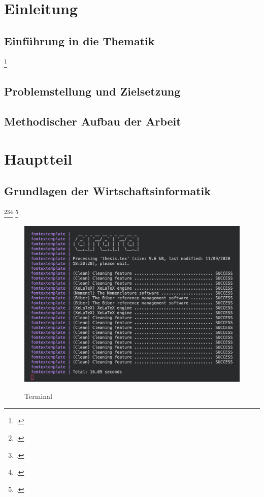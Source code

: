 \section{Einleitung}
\subsection{Einführung in die Thematik}
\blindtext{}
\blindtext\footcite[][]{mswpf}

\subsection{Problemstellung und Zielsetzung}
\blindtext

\subsection{Methodischer Aufbau der Arbeit}
\blindtext

\section{Hauptteil}
\subsection{Grundlagen der Wirtschaftsinformatik}
\blindtext\footcite[][]{msdatabind}\footcite[][]{Atypisch}\footcite[][34]{Digitaloekonomie}
\blindenumerate
\Blindtext\footcite[][415-426]{Tanenbaum2016}

\begin{figure}[!htb]
    \caption{Terminal}
    \includegraphics[width=1\textwidth]{.github/terminal}
    \captionsetup{width=1\textwidth}
    \label{abb_bsp}
\end{figure}
\blindtext

